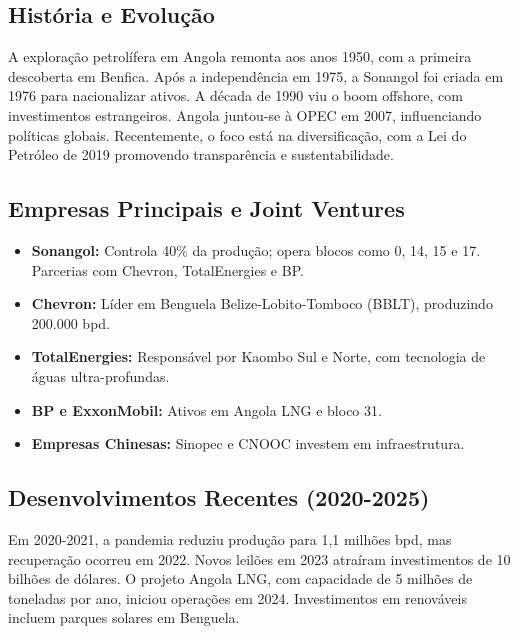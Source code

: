 \documentclass[12pt]{article}
\begin{document}
\subsection{História e Evolução}
A exploração petrolífera em Angola remonta aos anos 1950, com a primeira descoberta em Benfica. Após a independência em 1975, a Sonangol foi criada em 1976 para nacionalizar ativos. A década de 1990 viu o boom offshore, com investimentos estrangeiros. Angola juntou-se à OPEC em 2007, influenciando políticas globais. Recentemente, o foco está na diversificação, com a Lei do Petróleo de 2019 promovendo transparência e sustentabilidade.

\subsection{Empresas Principais e Joint Ventures}
\begin{itemize}
    \item \textbf{Sonangol:} Controla 40\% da produção; opera blocos como 0, 14, 15 e 17. Parcerias com Chevron, TotalEnergies e BP.
    \item \textbf{Chevron:} Líder em Benguela Belize-Lobito-Tomboco (BBLT), produzindo 200.000 bpd.
    \item \textbf{TotalEnergies:} Responsável por Kaombo Sul e Norte, com tecnologia de águas ultra-profundas.
    \item \textbf{BP e ExxonMobil:} Ativos em Angola LNG e bloco 31.
    \item \textbf{Empresas Chinesas:} Sinopec e CNOOC investem em infraestrutura.
\end{itemize}

\subsection{Desenvolvimentos Recentes (2020-2025)}
Em 2020-2021, a pandemia reduziu produção para 1,1 milhões bpd, mas recuperação ocorreu em 2022. Novos leilões em 2023 atraíram investimentos de 10 bilhões de dólares. O projeto Angola LNG, com capacidade de 5 milhões de toneladas por ano, iniciou operações em 2024. Investimentos em renováveis incluem parques solares em Benguela.
\end{document}
